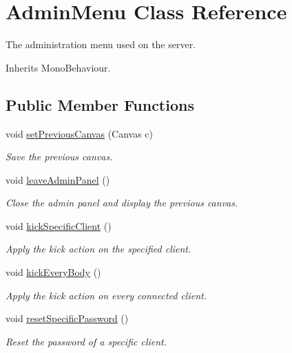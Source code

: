 \hypertarget{class_admin_menu}{\section{Admin\-Menu Class Reference}
\label{class_admin_menu}
}


The administration menu used on the server. 




Inherits Mono\-Behaviour.

\subsection*{Public Member Functions}
\begin{DoxyCompactItemize}
\item 
void \hyperlink{class_admin_menu_a28557a519d47a94fc71de68321459547}{set\-Previous\-Canvas} (Canvas c)
\begin{DoxyCompactList}\small\item\em Save the previous canvas.\end{DoxyCompactList}\item 
void \hyperlink{class_admin_menu_aeb4984df6b36ba8e27795165d4b8ea14}{leave\-Admin\-Panel} ()
\begin{DoxyCompactList}\small\item\em Close the admin panel and display the previous canvas.\end{DoxyCompactList}\item 
void \hyperlink{class_admin_menu_abca26dfaf49f55ddb94b9faa29efa178}{kick\-Specific\-Client} ()
\begin{DoxyCompactList}\small\item\em Apply the kick action on the specified client.\end{DoxyCompactList}\item 
void \hyperlink{class_admin_menu_a6551de993cdcb1b2089a55d53d7dd27c}{kick\-Every\-Body} ()
\begin{DoxyCompactList}\small\item\em Apply the kick action on every connected client.\end{DoxyCompactList}\item 
void \hyperlink{class_admin_menu_a7660de2d26ae70b1e4eb4ad1e6fcfc20}{reset\-Specific\-Password} ()
\begin{DoxyCompactList}\small\item\em Reset the password of a specific client.\end{DoxyCompactList}\end{DoxyCompactItemize}
